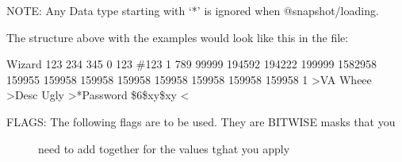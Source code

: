 \documentclass[letterpaper,10pt,english]{sphinxmanual}
\begin{document}
\sphinxAtStartPar
NOTE:  Any Data type starting with ‘*’ is ignored when @snapshot/loading.

\sphinxAtStartPar
The structure above with the examples would look like this in the file:

Wizard
123
234
345
0
123
\#123
1
789
99999
194592
194222
199999
1582958
159955
159958
159958
159958
159958
159958
159958
159958
\sphinxhyphen{}1
\textgreater{}VA
Wheee
\textgreater{}Desc
Ugly
\textgreater{}*Password
\$6\$xy\$xy
\textless{}
\begin{description}
\item[{FLAGS: The following flags are to be used.  They are BITWISE masks that you}] \leavevmode
\sphinxAtStartPar
need to add together for the values tghat you apply

\end{description}
\end{document}
